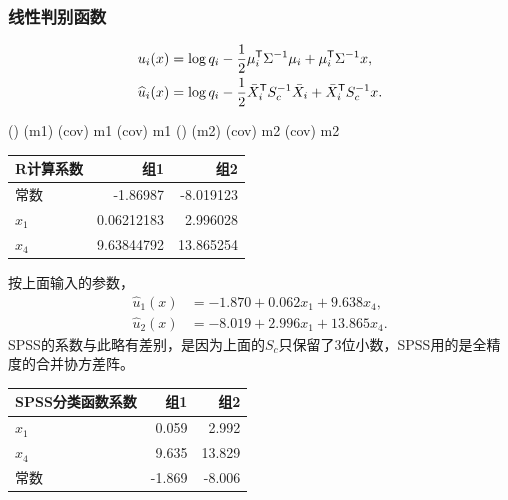 \subsubsection{线性判别函数}
\begin{align}
u_i(x)&=\log q_i-\frac12\mu_i^{\mathsf T}\Sigma^{-1}\mu_i+\mu_i^{\mathsf T}\Sigma^{-1}x,\\
\widehat u_i(x)&=\log q_i-\frac12\bar X_i^{\mathsf T} S_c^{-1}\bar X_i+\bar X_i^{\mathsf T} S_c^{-1}x.
\end{align}
\begin{code}
() \ROperator{-}  \ROperator{*} (m1) \ROperator{\%*\%} (cov) \ROperator{\%*\%} m1
(cov) \ROperator{\%*\%} m1
() \ROperator{-}  \ROperator{*} (m2) \ROperator{\%*\%} (cov) \ROperator{\%*\%} m2
(cov) \ROperator{\%*\%} m2
\end{code}
\begin{center}\begin{tabular}{lrr}\toprule
{\bfseries R计算系数}&{\bfseries 组1}&{\bfseries 组2}\\\midrule
常数&-1.86987&-8.019123\\$x_1$&0.06212183&2.996028\\$x_4$&9.63844792&13.865254\\\bottomrule
\end{tabular}\end{center}
按上面输入的参数，
\begin{align*}
\widehat u_1(x)&=-1.870+0.062x_1+9.638x_4,\\
\widehat u_2(x)&=-8.019+2.996x_1+13.865x_4.
\end{align*}
SPSS的系数与此略有差别，是因为上面的$S_c$只保留了3位小数，SPSS用的是全精度的合并协方差阵。
\begin{center}\begin{tabular}{lrr}\toprule
{\bfseries SPSS分类函数系数}&{\bfseries 组1}&{\bfseries 组2}\\\midrule
$x_1$&0.059&2.992\\$x_4$&9.635&13.829\\常数&-1.869&-8.006\\\bottomrule
\end{tabular}\end{center}
